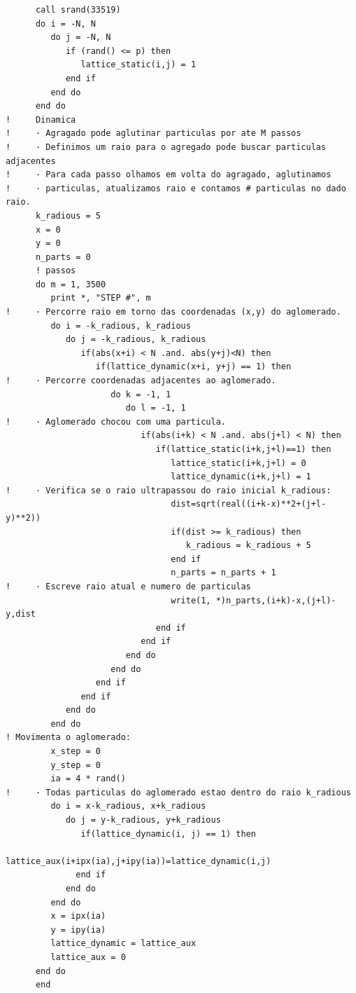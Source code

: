 \documentclass[a4paper, 11pt]{tufte-handout}
\begin{document}
\begin{verbatim}
      call srand(33519)
      do i = -N, N
         do j = -N, N
            if (rand() <= p) then
               lattice_static(i,j) = 1
            end if
         end do
      end do
!     Dinamica
!     · Agragado pode aglutinar particulas por ate M passos
!     · Definimos um raio para o agregado pode buscar particulas adjacentes
!     · Para cada passo olhamos em volta do agragado, aglutinamos
!     · particulas, atualizamos raio e contamos # particulas no dado raio.
      k_radious = 5
      x = 0
      y = 0
      n_parts = 0
      ! passos 
      do m = 1, 3500
         print *, "STEP #", m
!     · Percorre raio em torno das coordenadas (x,y) do aglomerado.
         do i = -k_radious, k_radious
            do j = -k_radious, k_radious
               if(abs(x+i) < N .and. abs(y+j)<N) then
                  if(lattice_dynamic(x+i, y+j) == 1) then
!     · Percorre coordenadas adjacentes ao aglomerado.
                     do k = -1, 1
                        do l = -1, 1
!     · Aglomerado chocou com uma particula.
                           if(abs(i+k) < N .and. abs(j+l) < N) then
                              if(lattice_static(i+k,j+l)==1) then
                                 lattice_static(i+k,j+l) = 0
                                 lattice_dynamic(i+k,j+l) = 1
!     · Verifica se o raio ultrapassou do raio inicial k_radious:
                                 dist=sqrt(real((i+k-x)**2+(j+l-y)**2))
                                 if(dist >= k_radious) then
                                    k_radious = k_radious + 5
                                 end if 
                                 n_parts = n_parts + 1
!     · Escreve raio atual e numero de particulas 
                                 write(1, *)n_parts,(i+k)-x,(j+l)-y,dist
                              end if
                           end if 
                        end do
                     end do
                  end if
               end if
            end do
         end do
! Movimenta o aglomerado:
         x_step = 0
         y_step = 0
         ia = 4 * rand()
!     · Todas particulas do aglomerado estao dentro do raio k_radious
         do i = x-k_radious, x+k_radious
            do j = y-k_radious, y+k_radious
               if(lattice_dynamic(i, j) == 1) then
                  lattice_aux(i+ipx(ia),j+ipy(ia))=lattice_dynamic(i,j)
              end if
            end do
         end do
         x = ipx(ia)
         y = ipy(ia)
         lattice_dynamic = lattice_aux
         lattice_aux = 0
      end do
      end
\end{verbatim}
\end{document}

